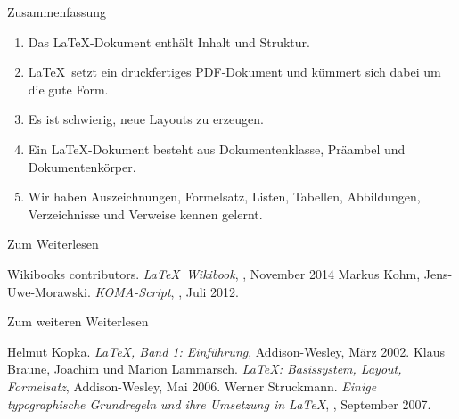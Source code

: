 \begin{frame}{Zusammenfassung}
  \begin{enumerate}
    \item Das \alert{\LaTeX-Dokument} enthält \alert{Inhalt und Struktur}.
    \item \LaTeX\ setzt ein druckfertiges \alert{PDF-Dokument} und kümmert sich dabei um die \alert{gute Form}.
    \item Es ist schwierig, \alert{neue Layouts} zu erzeugen.
    \item Ein \LaTeX-Dokument besteht aus \alert{Dokumentenklasse}, \alert{Präambel} und \alert{Dokumentenkörper}.
    \item Wir haben \alert{Auszeichnungen}, \alert{Formelsatz}, \alert{Listen}, \alert{Tabellen}, \alert{Abbildungen}, \alert{Verzeichnisse} und \alert{Verweise} kennen gelernt.
  \end{enumerate}
\end{frame}

\begin{Frame}[fragile]{Zum Weiterlesen}
  \begin{mybib}
      Wikibooks contributors.
      \newblock \emph{\LaTeX\ Wikibook},
      \newblock {}, November 2014
      Markus Kohm, Jens-Uwe-Morawski.
      \newblock \emph{KOMA-Script},
      \newblock {}, Juli 2012.
  \end{mybib}
\end{Frame}

\begin{Frame}[fragile]{Zum weiteren Weiterlesen}
  \begin{mybib}
      Helmut Kopka.
      \newblock \emph{\LaTeX, Band 1: Einführung},
      \newblock Addison-Wesley, März 2002.
      Klaus Braune, Joachim und Marion Lammarsch.
      \newblock \emph{\LaTeX: Basissystem, Layout, Formelsatz},
      \newblock Addison-Wesley, Mai 2006.
      Werner Struckmann.
      \newblock \emph{Einige typographische Grundregeln und ihre Umsetzung in \LaTeX},
      \newblock {}, September 2007.
  \end{mybib}
\end{Frame}